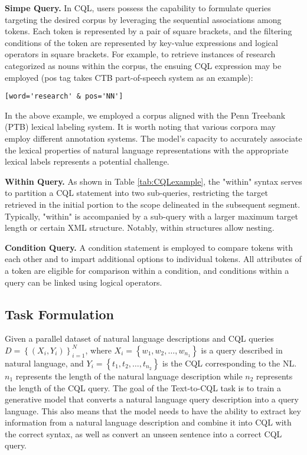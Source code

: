 \documentclass[11pt]{article}
\begin{document}
\begin{CJK*}{UTF8}{gbsn}
\textbf{Simpe Query.} In CQL, users possess the capability to formulate queries targeting the desired corpus by leveraging the sequential associations among tokens. Each token is represented by a pair of square brackets, and the filtering conditions of the token are represented by key-value expressions and logical operators in square brackets. For example, to retrieve instances of research categorized as nouns within the corpus, the ensuing CQL expression may be employed (pos tag takes CTB part-of-speech system as an example):

\verb|[word='research' & pos='NN']|

In the above example, we employed a corpus aligned with the Penn Treebank (PTB) \citep{ptb} lexical labeling system. It is worth noting that various corpora may employ different annotation systems. The model's capacity to accurately associate the lexical properties of natural language representations with the appropriate lexical labels represents a potential challenge.

\textbf{Within Query.} As shown in Table \ref{tab:CQLexample}, the "within" syntax serves to partition a CQL statement into two sub-queries, restricting the target retrieved in the initial portion to the scope delineated in the subsequent segment. Typically, "within" is accompanied by a sub-query with a larger maximum target length or certain XML structure. Notably, within structures allow nesting.

\textbf{Condition Query.} A condition statement is employed to compare tokens with each other and to impart additional options to individual tokens. All attributes of a token are eligible for comparison within a condition, and conditions within a query can be linked using logical operators.

\subsection{Task Formulation}

Given a parallel dataset of natural language descriptions and CQL queries $D = \left\{(X_i, Y_i)\right\}_{i=1}^N$, where $X_i = \left\{w_1, w_2, \ldots, w_{n_1}\right\}$ is a query described in natural language, and $Y_i = \left\{t_1, t_2, \ldots, t_{n_2}\right\}$ is the CQL corresponding to the NL. $n_1$ represents the length of the natural language description while $n_2$ represents the length of the CQL query. The goal of the Text-to-CQL task is to train a generative model that converts a natural language query description into a query language. This also means that the model needs to have the ability to extract key information from a natural language description and combine it into CQL with the correct syntax, as well as convert an unseen sentence into a correct CQL query.



\end{CJK*}
\end{document}
